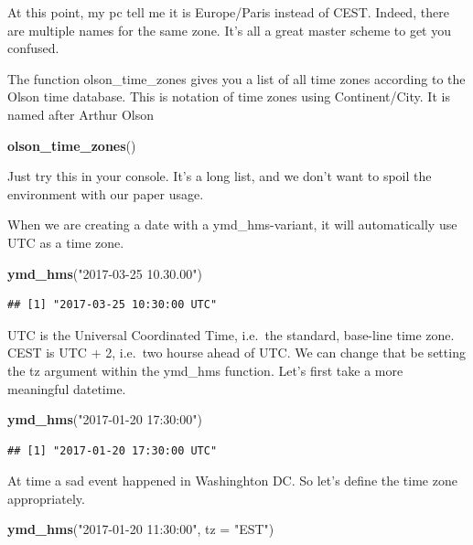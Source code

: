 \documentclass[]{tufte-book}
\newenvironment{Shaded}{}{}
\newcommand{\DataTypeTok}[1]{\textcolor[rgb]{0.56,0.13,0.00}{#1}}
\newcommand{\KeywordTok}[1]{\textcolor[rgb]{0.00,0.44,0.13}{\textbf{#1}}}
\newcommand{\NormalTok}[1]{#1}
\newcommand{\StringTok}[1]{\textcolor[rgb]{0.25,0.44,0.63}{#1}}
\begin{document}
At this point, my pc tell me it is Europe/Paris instead of CEST. Indeed, there are multiple names for the same zone. It's all a great master scheme to get you confused.

The function olson\_time\_zones gives you a list of all time zones according to the Olson time database. This is notation of time zones using Continent/City. It is named after Arthur Olson

\begin{Shaded}
\begin{Highlighting}[]
\KeywordTok{olson_time_zones}\NormalTok{()}
\end{Highlighting}
\end{Shaded}

Just try this in your console. It's a long list, and we don't want to spoil the environment with our paper usage.

When we are creating a date with a ymd\_hms-variant, it will automatically use UTC as a time zone.

\begin{Shaded}
\begin{Highlighting}[]
\KeywordTok{ymd_hms}\NormalTok{(}\StringTok{"2017-03-25 10.30.00"}\NormalTok{)}
\end{Highlighting}
\end{Shaded}

\begin{verbatim}
## [1] "2017-03-25 10:30:00 UTC"
\end{verbatim}

UTC is the Universal Coordinated Time, i.e.~the standard, base-line time zone. CEST is UTC + 2, i.e.~two hourse ahead of UTC. We can change that be setting the tz argument within the ymd\_hms function. Let's first take a more meaningful datetime.

\begin{Shaded}
\begin{Highlighting}[]
\KeywordTok{ymd_hms}\NormalTok{(}\StringTok{"2017-01-20 17:30:00"}\NormalTok{)}
\end{Highlighting}
\end{Shaded}

\begin{verbatim}
## [1] "2017-01-20 17:30:00 UTC"
\end{verbatim}

At time a sad event happened in Washinghton DC. So let's define the time zone appropriately.

\begin{Shaded}
\begin{Highlighting}[]
\KeywordTok{ymd_hms}\NormalTok{(}\StringTok{"2017-01-20 11:30:00"}\NormalTok{, }\DataTypeTok{tz =} \StringTok{"EST"}\NormalTok{)}
\end{Highlighting}
\end{Shaded}
\end{document}
